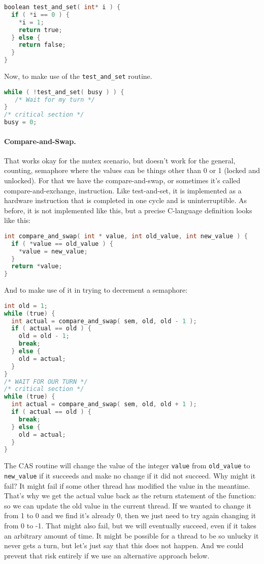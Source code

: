 \begin{lstlisting}[language=C]
boolean test_and_set( int* i ) {
  if ( *i == 0 ) {
    *i = 1;
    return true;
  } else {
    return false;
  }
}
\end{lstlisting}


Now, to make use of the \texttt{test\_and\_set} routine.

\begin{lstlisting}[language=C]
while ( !test_and_set( busy ) ) {
   /* Wait for my turn */
}
/* critical section */
busy = 0;
\end{lstlisting}

\paragraph{Compare-and-Swap.} That works okay for the mutex scenario, but doesn't work for the general, counting, semaphore where the values can be things other than 0 or 1 (locked and unlocked). For that we have the compare-and-swap, or sometimes it's called compare-and-exchange, instruction. Like test-and-set, it is implemented as a hardware instruction that is completed in one cycle and is uninterruptible. As before, it is not implemented like this, but a precise C-language definition looks like this:

\begin{lstlisting}[language=C]
int compare_and_swap( int * value, int old_value, int new_value ) {
  if ( *value == old_value ) {
    *value = new_value;
  }
  return *value;
}
\end{lstlisting}

And to make use of it in trying to decrement a semaphore:

\begin{lstlisting}[language=C]
int old = 1;
while (true) {
  int actual = compare_and_swap( sem, old, old - 1 );
  if ( actual == old ) {
    old = old - 1;
    break;
  } else {
    old = actual;
  }
}
/* WAIT FOR OUR TURN */
/* critical section */
while (true) {
  int actual = compare_and_swap( sem, old, old + 1 );
  if ( actual == old ) {
    break;
  } else {
    old = actual;
  }
}
\end{lstlisting}

The CAS routine will change the value of the integer \texttt{value} from \texttt{old\_value} to \texttt{new\_value} if it succeeds and make no change if it did not succeed. Why might it fail? It might fail if some other thread has modified the value in the meantime. That's why we get the actual value back as the return statement of the function: so we can update the old value in the current thread. If we wanted to change it from 1 to 0 and we find it's already 0, then we just need to try again changing it from 0 to -1. That might also fail, but we will eventually succeed, even if it takes an arbitrary amount of time. It might be possible for a thread to be so unlucky it never gets a turn, but let's just say that this does not happen. And we could prevent that risk entirely if we use an alternative approach below.

